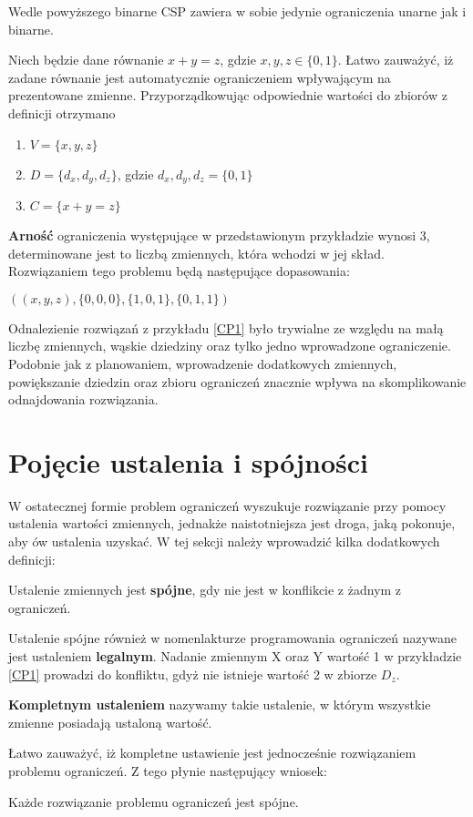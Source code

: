     Wedle powyższego binarne CSP zawiera w sobie jedynie ograniczenia unarne jak i binarne.
    \begin{example}
        \label{CP1}
        Niech będzie dane równanie $x+y=z$, gdzie $x,y,z \in \{0,1\}$. Łatwo zauważyć, iż zadane równanie jest automatycznie ograniczeniem 
        wpływającym na prezentowane zmienne. Przyporządkowując odpowiednie wartości do zbiorów z definicji \label{ConstraintProblem} otrzymano
        \begin{enumerate}
            \item $ V = \{x,y,z\} $
            \item $ D = \{d_{x},d_{y},d_{z}\}$, gdzie $d_{x},d_{y},d_{z} = \{0,1\}$
            \item $ C = \{x+y=z\}$
        \end{enumerate}
        \textbf{Arność} ograniczenia występujące w przedstawionym przykładzie wynosi 3, determinowane jest to liczbą zmiennych, która wchodzi w jej skład.
        Rozwiązaniem tego problemu będą następujące dopasowania:

        
        $((x,y,z),\{0,0,0\}, \{1,0,1\}, \{0,1,1\})$

    \end{example}
    Odnalezienie rozwiązań z przykładu \ref{CP1} było trywialne ze względu na małą liczbę zmiennych, wąskie dziedziny oraz tylko jedno wprowadzone ograniczenie.
    Podobnie jak z planowaniem, wprowadzenie dodatkowych zmiennych, powiększanie dziedzin oraz zbioru ograniczeń znacznie wpływa na skomplikowanie 
    odnajdowania rozwiązania.



\section{Pojęcie ustalenia i spójności}
    \label{SpójnośćRodział}
    W ostatecznej formie problem ograniczeń wyszukuje rozwiązanie przy pomocy ustalenia wartości zmiennych, jednakże naistotniejsza 
    jest droga, jaką pokonuje, aby ów ustalenia uzyskać. W tej sekcji należy wprowadzić kilka dodatkowych definicji:
    \begin{definition}
        Ustalenie zmiennych jest \textbf{spójne}, gdy nie jest w konflikcie z żadnym z ograniczeń.
    \end{definition}
    Ustalenie spójne również w nomenlakturze programowania ograniczeń nazywane jest ustaleniem \textbf{legalnym}.
    Nadanie zmiennym X oraz Y wartość 1 w przykładzie \ref{CP1} prowadzi do konfliktu, gdyż nie istnieje wartość 2 w zbiorze $D_{z}$.
    \begin{definition}
        \textbf{Kompletnym ustaleniem} nazywamy takie ustalenie, w którym wszystkie zmienne posiadają ustaloną wartość.
    \end{definition}
    Łatwo zauważyć, iż kompletne ustawienie jest jednocześnie rozwiązaniem problemu ograniczeń. Z tego płynie następujący wniosek:
    \begin{corollary}
        Każde rozwiązanie problemu ograniczeń jest spójne.
    \end{corollary}

